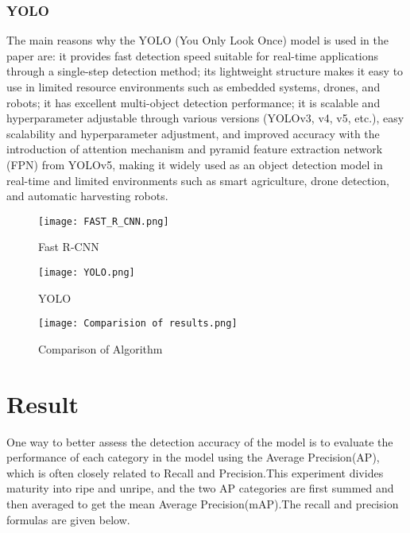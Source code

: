 \documentclass{ws-ijprai}
\begin{document}
\subsubsection{YOLO}
The main reasons why the YOLO (You Only Look Once) model is used in the paper are: it provides fast detection speed suitable for real-time applications through a single-step detection method; its lightweight structure makes it easy to use in limited resource environments such as embedded systems, drones, and robots; it has excellent multi-object detection performance; it is scalable and hyperparameter adjustable through various versions (YOLOv3, v4, v5, etc.), easy scalability and hyperparameter adjustment, and improved accuracy with the introduction of attention mechanism and pyramid feature extraction network (FPN) from YOLOv5, making it widely used as an object detection model in real-time and limited environments such as smart agriculture, drone detection, and automatic harvesting robots.


\begin{figure}
    \centering
    \texttt{[image: FAST\_R\_CNN.png]}
    \caption{Fast R-CNN}
    \label{fig:enter-label}
\end{figure}



\begin{figure}
     \centering
     \texttt{[image: YOLO.png]}
     \caption{YOLO}
     \label{fig:enter-label}
 \end{figure} 
 
\begin{figure}
    \centering
    \texttt{[image: Comparision of results.png]}
    \caption{Comparison of Algorithm}
    \label{fig:enter-label}
\end{figure}



\section{Result}

One way to better assess the detection accuracy of the  model is to evaluate the performance of each category in the model using the Average Precision(AP), which is often closely related to Recall and Precision.This experiment divides maturity into ripe and unripe, and the two AP categories are first summed and then averaged to get the  mean Average Precision(mAP).The recall and precision formulas are given below.
\end{document}
